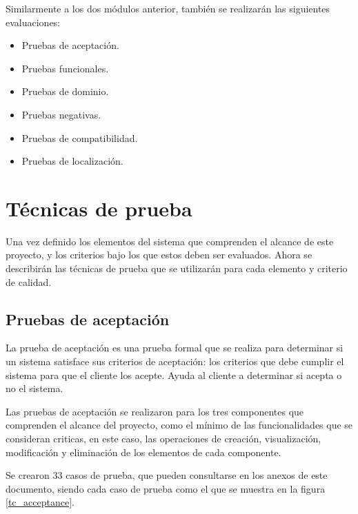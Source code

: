 Similarmente a los dos módulos anterior, también se realizarán las siguientes
evaluaciones:

\begin{itemize}
\item Pruebas de aceptación.
\item Pruebas funcionales.
\item Pruebas de dominio.
\item Pruebas negativas.
\item Pruebas de compatibilidad.
\item Pruebas de localización.
\end{itemize}

\section{Técnicas de prueba}
Una vez definido los elementos del sistema que comprenden el alcance de este
proyecto, y los criterios bajo los que estos deben ser evaluados. Ahora se
describirán las técnicas de prueba que se utilizarán para cada elemento y
criterio de calidad.

\subsection{Pruebas de aceptación}
La prueba de aceptación es una prueba formal que se realiza para determinar si
un sistema satisface sus criterios de aceptación: los criterios que debe cumplir
el sistema para que el cliente los acepte. Ayuda al cliente a determinar si
acepta o no el sistema\cite{Naik}.

Las pruebas de aceptación se realizaron para los tres componentes que comprenden
el alcance del proyecto, como el mínimo de las funcionalidades que se consideran
criticas, en este caso, las operaciones de creación, visualización, modificación
y eliminación de los elementos de cada componente.

Se crearon 33 casos de prueba, que pueden consultarse en los anexos de este
documento, siendo cada caso de prueba como el que se muestra en la figura
\ref{tc_acceptance}.

